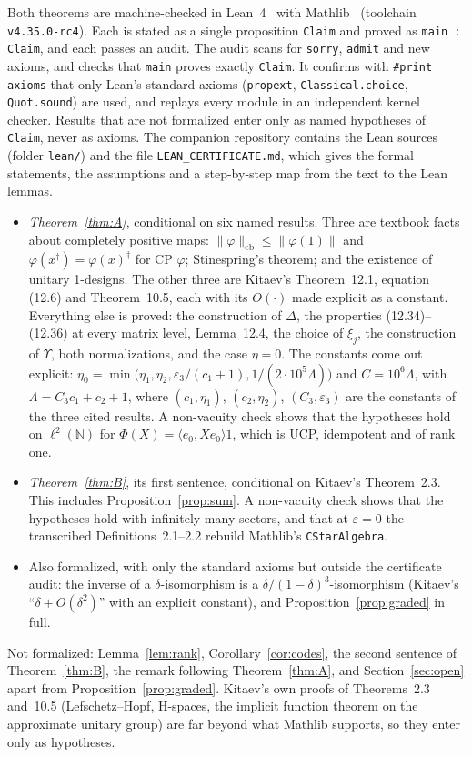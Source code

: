 \documentclass[11pt]{article}
\theoremstyle{remark}
\newcommand{\eps}{\varepsilon}
\newcommand{\cb}{\mathrm{cb}}
\begin{document}
Both theorems are machine-checked in Lean~4~\cite{Lean4} with Mathlib~\cite{Mathlib} (toolchain \texttt{v4.35.0-rc4}). Each is stated as a single proposition \texttt{Claim} and proved as \texttt{main : Claim}, and each passes an audit. The audit scans for \texttt{sorry}, \texttt{admit} and new axioms, and checks that \texttt{main} proves exactly \texttt{Claim}. It confirms with \texttt{\#print axioms} that only Lean's standard axioms (\texttt{propext}, \texttt{Classical.choice}, \texttt{Quot.sound}) are used, and replays every module in an independent kernel checker. Results that are not formalized enter only as named hypotheses of \texttt{Claim}, never as axioms. The companion repository contains the Lean sources (folder \texttt{lean/}) and the file \texttt{LEAN\_CERTIFICATE.md}, which gives the formal statements, the assumptions and a step-by-step map from the text to the Lean lemmas.
\begin{itemize}
\item \emph{Theorem~\ref{thm:A}}, conditional on six named results. Three are textbook facts about completely positive maps: $\|\varphi\|_\cb\le\|\varphi(1)\|$ and $\varphi(x^\dagger)=\varphi(x)^\dagger$ for CP $\varphi$; Stinespring's theorem; and the existence of unitary 1-designs. The other three are Kitaev's Theorem~12.1, equation (12.6) and Theorem~10.5, each with its $O(\cdot)$ made explicit as a constant. Everything else is proved: the construction of $\Delta$, the properties (12.34)--(12.36) at every matrix level, Lemma~12.4, the choice of $\xi_j$, the construction of $\Upsilon$, both normalizations, and the case $\eta=0$. The constants come out explicit: $\eta_0=\min\bigl(\eta_1,\eta_2,\eps_3/(c_1+1),1/(2\cdot10^5\Lambda)\bigr)$ and $C=10^6\Lambda$, with $\Lambda=C_3c_1+c_2+1$, where $(c_1,\eta_1)$, $(c_2,\eta_2)$, $(C_3,\eps_3)$ are the constants of the three cited results. A non-vacuity check shows that the hypotheses hold on $\ell^2(\mathbb{N})$ for $\Phi(X)=\langle e_0,Xe_0\rangle1$, which is UCP, idempotent and of rank one.
\item \emph{Theorem~\ref{thm:B}}, its first sentence, conditional on Kitaev's Theorem~2.3. This includes Proposition~\ref{prop:sum}. A non-vacuity check shows that the hypotheses hold with infinitely many sectors, and that at $\eps=0$ the transcribed Definitions~2.1--2.2 rebuild Mathlib's \texttt{CStarAlgebra}.
\item Also formalized, with only the standard axioms but outside the certificate audit: the inverse of a $\delta$-isomorphism is a $\delta/(1-\delta)^3$-isomorphism (Kitaev's ``$\delta+O(\delta^2)$'' with an explicit constant), and Proposition~\ref{prop:graded} in full.
\end{itemize}
Not formalized: Lemma~\ref{lem:rank}, Corollary~\ref{cor:codes}, the second sentence of Theorem~\ref{thm:B}, the remark following Theorem~\ref{thm:A}, and Section~\ref{sec:open} apart from Proposition~\ref{prop:graded}. Kitaev's own proofs of Theorems~2.3 and~10.5 (Lefschetz--Hopf, H-spaces, the implicit function theorem on the approximate unitary group) are far beyond what Mathlib supports, so they enter only as hypotheses.
\end{document}

